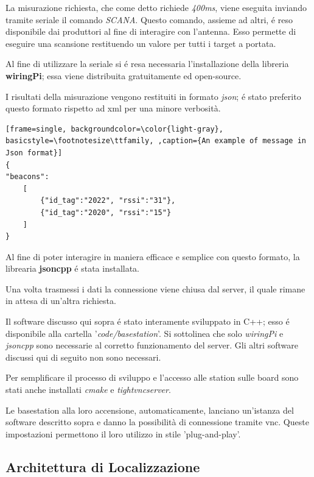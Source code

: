 \documentclass{article}
\begin{document}
La misurazione richiesta, che come detto richiede \textit{400ms}, viene eseguita inviando tramite seriale il comando \textit{SCANA}.
Questo comando, assieme ad altri, \'e reso disponibile dai produttori al fine di interagire con l'antenna. Esso permette di eseguire una scansione restituendo un valore per tutti i target a portata.

Al fine di utilizzare la seriale si \'e resa necessaria l'installazione della libreria \textbf{wiringPi}; essa viene distribuita gratuitamente ed open-source.

I risultati della misurazione vengono restituiti in formato \textit{json}; \'e stato preferito questo formato rispetto ad xml per una minore verbosit\`a.

\pagebreak

\begin{lstlisting}[frame=single, backgroundcolor=\color{light-gray}, basicstyle=\footnotesize\ttfamily, ,caption={An example of message in Json format}]
{
"beacons": 
	[
		{"id_tag":"2022", "rssi":"31"},
		{"id_tag":"2020", "rssi":"15"}
	]
}
\end{lstlisting}


Al fine di poter interagire in maniera efficace e semplice con questo formato, la librearia \textbf{jsoncpp} \'e stata installata.

Una volta trasmessi i dati la connessione viene chiusa dal server, il quale rimane in attesa di un'altra richiesta.


Il software discusso qui sopra \'e stato interamente sviluppato in C++; esso \'e disponibile alla cartella '\textit{code/basestation}'.
Si sottolinea che solo \textit{wiringPi} e \textit{jsoncpp} sono necessarie al corretto funzionamento del server. Gli altri software discussi qui di seguito non sono necessari.

Per semplificare il processo di sviluppo e l'accesso alle station sulle board sono stati anche installati \textit{cmake} e \textit{tightvncserver}.


Le basestation alla loro accensione, automaticamente, lanciano un'istanza del software descritto sopra e danno la possibilit\`a di connessione tramite vnc.
Queste impostazioni permettono il loro utilizzo in stile 'plug-and-play'.


\subsection{Architettura di Localizzazione}
\end{document}
